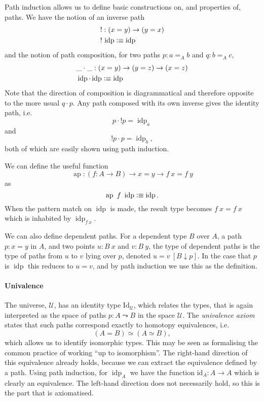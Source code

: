 \documentclass[12pt, parskip, DIV=14]{scrbook}
\newcommand{\defeq}{\vcentcolon\equiv}
\newcommand{\ap}{\operatorname{ap}}
\newcommand{\idp}{\operatorname{idp}}
\begin{document}
Path induction allows us to define basic constructions on, and properties of, paths. We have the notion of an inverse path
\begin{align*}
  &! : (x = y) \to (y = x) \\
  &!\,\idp \defeq \idp
\end{align*}
and the notion of path composition, for two paths $p : a =_A b$ and $q : b =_A c$,
\begin{align*}
  &\_\cdot\_ : (x = y) \to (y = z) \to (x = z) \\
  &\idp \cdot \idp \defeq \idp
\end{align*}
Note that the direction of composition is diagrammatical and therefore opposite to the more usual $q \cdot p$. Any path composed with its own inverse gives the identity path, i.e.
$$p \cdot {!}p = \idp_a$$
and
$$!p \cdot p = \idp_b,$$
both of which are easily shown using path induction.

We can define the useful function $$\ap : (f : A \to B) \to x = y \to f~x = f~y$$ as $$\ap~f~\idp \defeq \idp.$$ When the pattern match on $\idp$ is made, the result type becomes $f~x = f~x$ which is inhabited by $\idp_{f~x}$.

We can also define dependent paths. For a dependent type $B$ over $A$, a path $p : x = y$ in $A$, and two points $u : B~x$ and $v : B~y$, the type of dependent paths is the type of paths from $u$ to $v$ lying over $p$, denoted $u = v~[B \downarrow p]$. In the case that $p$ is $\idp$ this reduces to $u = v$, and by path induction we use this as the definition.

\paragraph{Univalence}

The universe, $\mathcal{U}$, has an identity type $\mathrm{Id}_\mathcal{U}$, which relates the types, that is again interpreted as the space of paths $p : A \leadsto B$ in the space $\mathcal{U}$. The \textit{univalence axiom} states that such paths correspond exactly to homotopy equivalences, i.e. $$(A = B) \simeq (A \simeq B),$$ which allows us to identify isomorphic types. This may be seen as formalising the common practice of working ``up to isomorphism''.  The right-hand direction of this equivalence already holds, because we can extract the equivalence defined by a path. Using path induction, for $\idp_A$ we have the function $\mathrm{id}_A : A \to A$ which is clearly an equivalence. The left-hand direction does not necessarily hold, so this is the part that is axiomatised.
\end{document}
